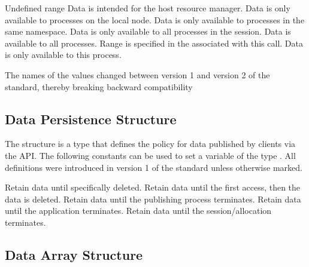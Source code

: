 \begin{constantdesc}
%
Undefined range
%
Data is intended for the host resource manager.
%
Data is only available to processes on the local node.
%
Data is only available to processes in the same namespace.
%
Data is only available to all processes in the session.
%
Data is available to all processes.
%
Range is specified in the  associated with this call.
%
Data is only available to this process.
%
\end{constantdesc}

\adviceuserstart
The names of the  values changed between version 1 and version 2 of the standard, thereby breaking backward compatibility
\adviceuserend

\subsection{Data Persistence Structure}

The  structure is a  type that defines the policy for data published by clients via the  \ac{API}.
The following constants can be used to set a variable of the type . All definitions were introduced in version 1 of the standard unless otherwise marked.

\begin{constantdesc}
%
Retain data until specifically deleted.
%
Retain data until the first access, then the data is deleted.
%
Retain data until the publishing process terminates.
%
Retain data until the application terminates.
%
Retain data until the session/allocation terminates.
%
\end{constantdesc}

\subsection{Data Array Structure}

